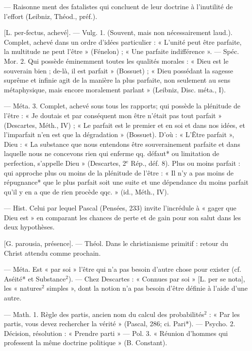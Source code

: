\begin{itemize}[leftmargin=1cm, label=, itemsep=1pt]
 — Raisonne
ment des fatalistes qui concluent de
leur doctrine à l’inutilité de l'effort
(Leibniz, Théod., préf.).

 [L. per-fectus, achevé]. — Vulg.
1. (Souvent, mais non nécessairement laud.). Complet, achevé dans
un ordre d'idées particulier : « L'unité
peut être parfaite, la multitude ne
peut l'être » (Fénelon) ; « Une parfaite indifférence ». — Spéc. Mor.
2. Qui possède éminemment toutes
les qualités morales : « Dieu est le
souverain bien ; de-là, il est parfait »
(Bossuet) ; « Dieu possédant la sagesse suprême et infinie agit de la
manière la plus parfaite, non seulement au sens métaphysique, mais
encore moralement parlant » (Leibniz, Disc. méta., I).

— Méta. 3. Complet, achevé sous
tous les rapports; qui possède la
plénitude de l’être : « Je doutais et
par conséquent mon être n'était pas
tout parfait » (Descartes, Méth., IV) ;
« Le parfait est le premier et en soi
et dans nos idées, et l’imparfait n’en
est que la dégradation » (Bossuet).
D'où : « L'Être parfait », Dieu : « La
substance que nous entendons être
souverainement parfaite et dans laquelle nous ne concevons rien qui
enferme qq. défaut* ou limitation de
perfection, s'appelle Dieu » (Descartes, 2$^\text{e}$ Rép., déf. 8). Plus ou
moins parfait : qui approche plus ou
moins de la plénitude de l'être : « Il
n’y a pas moins de répugnance* que
le plus parfait soit une suite et une
dépendance du moins parfait qu'il
y en a que de rien procède qqc. »
(id., Méth., IV).

 — Hist. Celui
par lequel Pascal (Pensées, 233)
invite l’incrédule à « gager que Dieu
est » en comparant les chances de
perte et de gain pour son salut dans
les deux hypothèses.

 [G. parousia, présence]. —
Théol. Dans le christianisme primitif : retour du Christ attendu
comme prochain.

 — Méta. Est « par soi » l'être
qui n’a pas besoin d’autre chose
pour exister (cf. Aséité* et Substance$^2$). — Chez Descartes : « Connues par soi » [L. per se nota], les
« natures$^2$ simples », dont la notion
n’a pas besoin d’être définie à l’aide
d’une autre.

 — Math. 1. Règle des partis,
ancien nom du calcul des probabilités$^2$ : « Par les partis, vous devez
rechercher la vérité » (Pascal, 286;
ci. Pari*). — Psycho. 2. Décision,
résolution : « Prendre parti » —
Pol. 3. « Réunion d'hommes qui
professent la même doctrine politique » (B. Constant).


\end{itemize}
